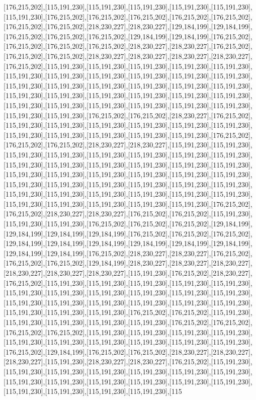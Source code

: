 [176,215,202],[115,191,230],[115,191,230],[115,191,230],[115,191,230],[115,191,230],[115,191,230],[176,215,202],[176,215,202],[176,215,202],[176,215,202],[176,215,202],[176,215,202],[176,215,202],[218,230,227],[218,230,227],[129,184,199],[129,184,199],[176,215,202],[176,215,202],[176,215,202],[129,184,199],[129,184,199],[176,215,202],[176,215,202],[176,215,202],[176,215,202],[218,230,227],[218,230,227],[176,215,202],[176,215,202],[176,215,202],[218,230,227],[218,230,227],[218,230,227],[218,230,227],[176,215,202],[115,191,230],[115,191,230],[115,191,230],[115,191,230],[115,191,230],[115,191,230],[115,191,230],[115,191,230],[115,191,230],[115,191,230],[115,191,230],[115,191,230],[115,191,230],[115,191,230],[115,191,230],[115,191,230],[115,191,230],[115,191,230],[115,191,230],[115,191,230],[115,191,230],[115,191,230],[115,191,230],[115,191,230],[115,191,230],[115,191,230],[115,191,230],[115,191,230],[115,191,230],[115,191,230],[115,191,230],[176,215,202],[176,215,202],[218,230,227],[176,215,202],[115,191,230],[115,191,230],[115,191,230],[115,191,230],[115,191,230],[115,191,230],[115,191,230],[115,191,230],[115,191,230],[115,191,230],[115,191,230],[176,215,202],[176,215,202],[176,215,202],[218,230,227],[218,230,227],[115,191,230],[115,191,230],[115,191,230],[115,191,230],[115,191,230],[115,191,230],[115,191,230],[115,191,230],[115,191,230],[115,191,230],[115,191,230],[115,191,230],[115,191,230],[115,191,230],[115,191,230],[115,191,230],[115,191,230],[115,191,230],[115,191,230],[115,191,230],[115,191,230],[115,191,230],[115,191,230],[115,191,230],[115,191,230],[115,191,230],[115,191,230],[115,191,230],[115,191,230],[115,191,230],[115,191,230],[115,191,230],[115,191,230],[115,191,230],[115,191,230],[115,191,230],[115,191,230],[176,215,202],[176,215,202],[218,230,227],[218,230,227],[176,215,202],[176,215,202],[115,191,230],[115,191,230],[115,191,230],[176,215,202],[176,215,202],[176,215,202],[129,184,199],[129,184,199],[129,184,199],[129,184,199],[176,215,202],[176,215,202],[176,215,202],[129,184,199],[129,184,199],[129,184,199],[129,184,199],[129,184,199],[129,184,199],[129,184,199],[129,184,199],[176,215,202],[218,230,227],[218,230,227],[176,215,202],[176,215,202],[176,215,202],[129,184,199],[218,230,227],[218,230,227],[218,230,227],[218,230,227],[218,230,227],[218,230,227],[115,191,230],[176,215,202],[218,230,227],[176,215,202],[115,191,230],[115,191,230],[115,191,230],[115,191,230],[115,191,230],[115,191,230],[115,191,230],[115,191,230],[115,191,230],[115,191,230],[115,191,230],[115,191,230],[115,191,230],[115,191,230],[115,191,230],[115,191,230],[115,191,230],[115,191,230],[115,191,230],[115,191,230],[176,215,202],[176,215,202],[115,191,230],[115,191,230],[115,191,230],[115,191,230],[115,191,230],[176,215,202],[176,215,202],[176,215,202],[176,215,202],[115,191,230],[115,191,230],[115,191,230],[115,191,230],[115,191,230],[115,191,230],[115,191,230],[115,191,230],[115,191,230],[115,191,230],[176,215,202],[129,184,199],[176,215,202],[176,215,202],[218,230,227],[218,230,227],[218,230,227],[115,191,230],[218,230,227],[218,230,227],[176,215,202],[115,191,230],[115,191,230],[115,191,230],[115,191,230],[115,191,230],[115,191,230],[115,191,230],[115,191,230],[115,191,230],[115,191,230],[115,191,230],[115,191,230],[115,191,230],[115,191,230],[115,191,230],[115,191,230],[115,191,230],[115